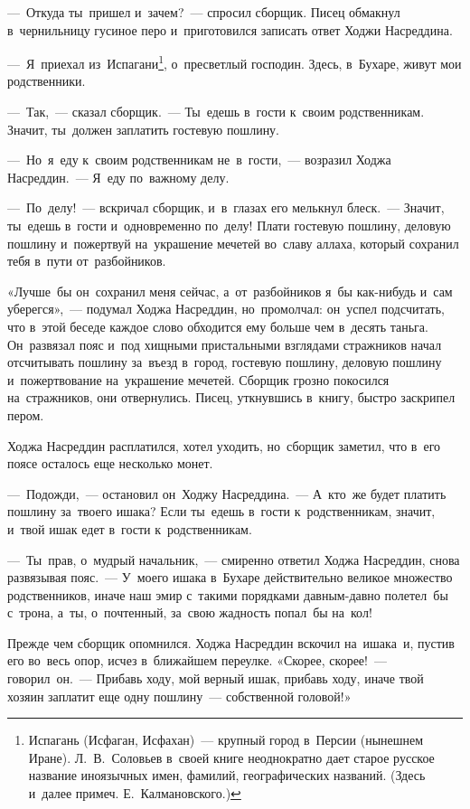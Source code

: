 \documentclass[12pt,a4paper]{book}
\begin{document}
—~Откуда ты~пришел и~зачем?~— спросил сборщик. Писец обмакнул в~чернильницу гусиное перо и~приготовился записать ответ Ходжи Насреддина.

—~Я~приехал из~Испагани\footnote{Испагань (Исфаган, Исфахан)~— крупный город в~Персии (нынешнем Иране). Л.~В.~Соловьев в~своей книге неоднократно дает старое русское название иноязычных имен, фамилий, географических названий. (Здесь и~далее примеч. Е.~Калмановского.)}, о~пресветлый господин. Здесь, в~Бухаре, живут мои родственники.

—~Так,~— сказал сборщик.~— Ты~едешь в~гости к~своим родственникам. Значит, ты~должен заплатить гостевую пошлину.

—~Но~я~еду к~своим родственникам не~в~гости,~— возразил Ходжа Насреддин.~— Я~еду по~важному делу.

—~По~делу!~— вскричал сборщик, и~в~глазах его мелькнул блеск.~— Значит, ты~едешь в~гости и~одновременно по~делу! Плати гостевую пошлину, деловую пошлину и~пожертвуй на~украшение мечетей во~славу аллаха, который сохранил тебя в~пути от~разбойников.

«Лучше~бы он~сохранил меня сейчас, а~от~разбойников я~бы как-нибудь и~сам уберегся»,~— подумал Ходжа Насреддин, но~промолчал: он~успел подсчитать, что в~этой беседе каждое слово обходится ему больше чем в~десять таньга. Он~развязал пояс и~под хищными пристальными взглядами стражников начал отсчитывать пошлину за~въезд в~город, гостевую пошлину, деловую пошлину и~пожертвование на~украшение мечетей. Сборщик грозно покосился на~стражников, они отвернулись. Писец, уткнувшись в~книгу, быстро заскрипел пером.

Ходжа Насреддин расплатился, хотел уходить, но~сборщик заметил, что в~его поясе осталось еще несколько монет.

—~Подожди,~— остановил он~Ходжу Насреддина.~— А~кто~же будет платить пошлину за~твоего ишака? Если ты~едешь в~гости к~родственникам, значит, и~твой ишак едет в~гости к~родственникам.

—~Ты~прав, о~мудрый начальник,~— смиренно ответил Ходжа Насреддин, снова развязывая пояс.~— У~моего ишака в~Бухаре действительно великое множество родственников, иначе наш эмир с~такими порядками давным-давно полетел~бы с~трона, а~ты, о~почтенный, за~свою жадность попал~бы на~кол!

Прежде чем сборщик опомнился. Ходжа Насреддин вскочил на~ишака~и, пустив его во~весь опор, исчез в~ближайшем переулке. «Скорее, скорее!~— говорил~он.~— Прибавь ходу, мой верный ишак, прибавь ходу, иначе твой хозяин заплатит еще одну пошлину~— собственной головой!»
\end{document}
